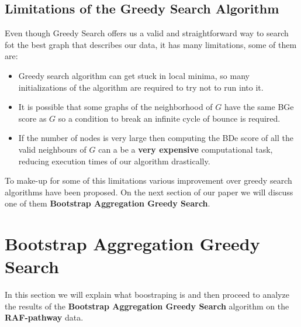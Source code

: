 \documentclass{article}
\begin{document}
	\subsection{Limitations of the Greedy Search Algorithm}
	Even though Greedy Search offers us a valid and straightforward way to search
	fot the best graph that describes our data, it has many limitations, some of them are:
	\begin{itemize}
		\item Greedy search algorithm can get stuck in local minima, so many
			initializations of the algorithm are required to try not to run into it. 
		\item It is possible that some graphs of the neighborhood of $G$ have the
			same BGe score as $G$ so a condition to break an infinite cycle of bounce
			is required.
		\item If the number of nodes is very large then computing the BDe score of
			all the valid neighbours of $G$ can a be a \textbf{very expensive}
			computational task, reducing execution times of our algorithm
			drastically.
	\end{itemize}
	To make-up for some of this limitations various improvement over greedy
	search algorithms have been proposed\cite{bnsTechniques}. On the next section of our
	paper we will discuss one of them \textbf{Bootstrap Aggregation Greedy Search}.
	\section{Bootstrap Aggregation Greedy Search}
	In this section we will explain what boostraping is and then proceed to analyze the results of the \textbf{Bootstrap
	Aggregation Greedy Search} algorithm\cite{baggedBS1} on the \textbf{RAF-pathway} data.
\end{document}
